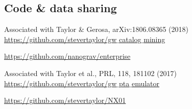 \documentclass[11pt,letterpaper,sans]{moderncv}
\begin{document}
\subsection{Code \& data sharing} 
%
 \vspace{-0.1cm}
\hspace{0.71cm} Associated with Taylor \& Gerosa, arXiv:1806.08365 (2018) \\ \vspace{-0.1cm}
\hspace{0.6cm} {\color{color1} \href{https://github.com/stevertaylor/gw_catalog_mining}{https://github.com/stevertaylor/gw$\_$catalog$\_$mining}}

 \vspace{-0.1cm}
\hspace{0.71cm} {\color{color1} \href{https://github.com/nanograv/enterprise}{https://github.com/nanograv/enterprise}}


 \vspace{-0.1cm}
\hspace{0.71cm} Associated with Taylor et al., PRL, 118, 181102 (2017) \\ \vspace{-0.1cm}
\hspace{0.6cm} {\color{color1} \href{https://github.com/stevertaylor/gw_pta_emulator}{https://github.com/stevertaylor/gw$\_$pta$\_$emulator}}


 \vspace{-0.1cm}
\hspace{0.71cm} {\color{color1} \href{https://github.com/stevertaylor/NX01}{https://github.com/stevertaylor/NX01}}
\end{document}
